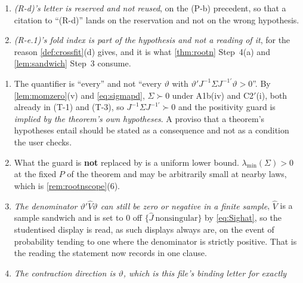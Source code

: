 \begin{remark}
\begin{enumerate}
{theorem}, and \eqref{eq:re2window} is what makes the choice real wherever it is offered.
\item[(6)] \emph{\textup{(R-d)}'s letter is \emph{reserved and not reused}}, on the \textup{(P-b)}
precedent, so that a citation to ``(R-d)'' lands on the reservation and not on the wrong hypothesis.
\item[(7)] \emph{\textup{(R-e.1)}'s fold index is part of the hypothesis and not a reading of it}, for
the reason \cref{def:crossfit}(d) gives, and it is what \cref{thm:rootn} Step~4(a) and
\cref{lem:sandwich} Step~3 consume.
\end{enumerate}
\end{remark}

\begin{remark}\label{rem:rootnread}
\begin{enumerate}
\item[(1)] The quantifier is ``every'' and not ``every $\vartheta$ with
$\vartheta'J^{-1}\Sigma J^{-1\prime}\vartheta>0$''. By \cref{lem:momzero}\textup{(v)} and
\eqref{eq:sigmapd}, $\Sigma\succ0$ under A1b(iv) and C2$'$(i), both already in (T-1) and (T-3), so
$J^{-1}\Sigma J^{-1\prime}\succ0$ and the positivity guard is \emph{implied by the theorem's own
hypotheses}. A proviso that a theorem's hypotheses entail should be stated as a consequence and not
as a condition the user checks.
\item[(2)] What the guard is \textbf{not} replaced by is a uniform lower bound.
$\lambda_{\min}(\Sigma)>0$ at the fixed $P$ of the theorem and may be arbitrarily small at nearby laws,
which is \cref{rem:rootnscope}\textup{(6)}.
\item[(3)] \emph{The denominator $\vartheta'\hat V\vartheta$ can still be zero or negative in a finite
sample}, $\hat V$ is a sample sandwich and is set to $0$ off $\{\hat J\ \text{nonsingular}\}$ by
\eqref{eq:Sighat}, so the studentised display is read, as such displays always are, on the event of
probability tending to one where the denominator is strictly positive. That is the reading the statement
now records in one clause.
\item[(4)] \emph{The contraction direction is $\vartheta$, which is this file's binding letter for exactly
}
\end{enumerate}
\end{remark}
